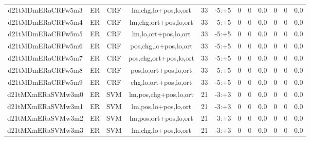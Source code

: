 \documentclass[a4paper]{article}
\begin{document}
\begin{landscape}
\begin{center}
\begin{tabular}{ |c|c|c|c|c|c|c|c|c|c|c|c|}
 
 	
 	\small{ d21tMDmERaCRFw5m3 } & ER & CRF & lm,chg,lo+pos,lo,ort  &  33 &  -5:+5  &  0 & 0 & 0.0  &  0 & 0 & 0.0 \\
 	

 
 	
 	\small{ d21tMDmERaCRFw5m4 } & ER & CRF & lm,chg,ort+pos,lo,ort  &  33 &  -5:+5  &  0 & 0 & 0.0  &  0 & 0 & 0.0 \\
 	

 
 	
 	\small{ d21tMDmERaCRFw5m5 } & ER & CRF & lm,lo,ort+pos,lo,ort  &  33 &  -5:+5  &  0 & 0 & 0.0  &  0 & 0 & 0.0 \\
 	

 
 	
 	\small{ d21tMDmERaCRFw5m6 } & ER & CRF & pos,chg,lo+pos,lo,ort  &  33 &  -5:+5  &  0 & 0 & 0.0  &  0 & 0 & 0.0 \\
 	

 
 	
 	\small{ d21tMDmERaCRFw5m7 } & ER & CRF & pos,chg,ort+pos,lo,ort  &  33 &  -5:+5  &  0 & 0 & 0.0  &  0 & 0 & 0.0 \\
 	

 
 	
 	\small{ d21tMDmERaCRFw5m8 } & ER & CRF & pos,lo,ort+pos,lo,ort  &  33 &  -5:+5  &  0 & 0 & 0.0  &  0 & 0 & 0.0 \\
 	

 
 	
 	\small{ d21tMDmERaCRFw5m9 } & ER & CRF & chg,lo,ort+pos,lo,ort  &  33 &  -5:+5  &  0 & 0 & 0.0  &  0 & 0 & 0.0 \\
 	

 
 	
 	\small{ d21tMXmERaSVMw3m0 } & ER & SVM & lm,pos,chg+pos,lo,ort  &  21 &  -3:+3  &  0 & 0 & 0.0  &  0 & 0 & 0.0 \\
 	

 
 	
 	\small{ d21tMXmERaSVMw3m1 } & ER & SVM & lm,pos,lo+pos,lo,ort  &  21 &  -3:+3  &  0 & 0 & 0.0  &  0 & 0 & 0.0 \\
 	

 
 	
 	\small{ d21tMXmERaSVMw3m2 } & ER & SVM & lm,pos,ort+pos,lo,ort  &  21 &  -3:+3  &  0 & 0 & 0.0  &  0 & 0 & 0.0 \\
 	

 
 	
 	\small{ d21tMXmERaSVMw3m3 } & ER & SVM & lm,chg,lo+pos,lo,ort  &  21 &  -3:+3  &  0 & 0 & 0.0  &  0 & 0 & 0.0 \\
 	


\end{tabular}
\end{center}
\end{landscape}
\end{document}
